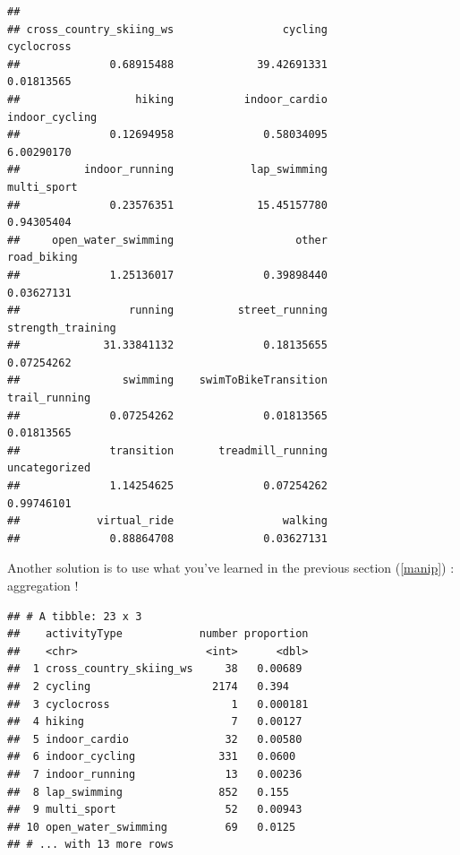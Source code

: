 \documentclass[
]{book}
\newenvironment{Shaded}{\begin{snugshade}}{\end{snugshade}}
\newcommand{\DataTypeTok}[1]{\textcolor[rgb]{0.13,0.29,0.53}{#1}}
\newcommand{\KeywordTok}[1]{\textcolor[rgb]{0.13,0.29,0.53}{\textbf{#1}}}
\newcommand{\NormalTok}[1]{#1}
\newcommand{\OperatorTok}[1]{\textcolor[rgb]{0.81,0.36,0.00}{\textbf{#1}}}
\newcommand{\StringTok}[1]{\textcolor[rgb]{0.31,0.60,0.02}{#1}}
\begin{document}
\begin{verbatim}
## 
## cross_country_skiing_ws                 cycling              cyclocross 
##              0.68915488             39.42691331              0.01813565 
##                  hiking           indoor_cardio          indoor_cycling 
##              0.12694958              0.58034095              6.00290170 
##          indoor_running            lap_swimming             multi_sport 
##              0.23576351             15.45157780              0.94305404 
##     open_water_swimming                   other             road_biking 
##              1.25136017              0.39898440              0.03627131 
##                 running          street_running       strength_training 
##             31.33841132              0.18135655              0.07254262 
##                swimming    swimToBikeTransition           trail_running 
##              0.07254262              0.01813565              0.01813565 
##              transition       treadmill_running           uncategorized 
##              1.14254625              0.07254262              0.99746101 
##            virtual_ride                 walking 
##              0.88864708              0.03627131
\end{verbatim}

Another solution is to use what you've learned in the previous section (\ref{manip}) : aggregation !

\begin{Shaded}
\end{Shaded}

\begin{verbatim}
## # A tibble: 23 x 3
##    activityType            number proportion
##    <chr>                    <int>      <dbl>
##  1 cross_country_skiing_ws     38   0.00689 
##  2 cycling                   2174   0.394   
##  3 cyclocross                   1   0.000181
##  4 hiking                       7   0.00127 
##  5 indoor_cardio               32   0.00580 
##  6 indoor_cycling             331   0.0600  
##  7 indoor_running              13   0.00236 
##  8 lap_swimming               852   0.155   
##  9 multi_sport                 52   0.00943 
## 10 open_water_swimming         69   0.0125  
## # ... with 13 more rows
\end{verbatim}
\end{document}
